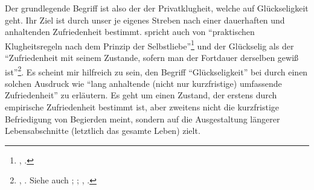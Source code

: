 Der grundlegende Begriff ist also der der Privatklugheit, welche auf
Glückseligkeit geht. Ihr Ziel ist durch unser je eigenes Streben nach einer
dauerhaften und anhaltenden Zufriedenheit bestimmt. 
spricht auch von \enquote{praktischen Klugheitsregeln nach dem Prinzip der
Selbstliebe}\footnote{\cite[][\S~91]{Kant:KritikderUrteilskraft2009}, \cite[][V:
470.9--10]{Kant:GesammelteWerke1900ff.}.} und der Glückselig als der
\enquote{Zufriedenheit mit seinem Zustande, sofern man der Fortdauer derselben
gewiß ist}\footnote{\cite[][A 16]{Kant:DieMetaphysikderSitten1977Tugendlehre},
\cite[][VI: 387.26--27]{Kant:GesammelteWerke1900ff.}. Siehe auch
\cite[][BA 1\,f.,]{Kant:GrundlegungzurMetaphysikderSitten1965}
\cite[][IV: 393.14--16]{Kant:GesammelteWerke1900ff.};
\cite[][A 168\,f.,]{Kant:DieMetaphysikderSitten1977Tugendlehre}
\cite[][VI: 480.23--25]{Kant:GesammelteWerke1900ff.};
\cite[][A 80]{Kant:DieReligioninnerhalbderGrenzenderblossenVernunft1977},
\cite[][VI: 67.20--23]{Kant:GesammelteWerke1900ff.}.}.
Es scheint mir hilfreich zu sein, den Begriff \enquote{Glückseligkeit} bei  durch einen solchen Ausdruck wie \enquote{lang anhaltende (nicht nur kurzfristige) umfassende Zufriedenheit} zu erläutern. Es geht um einen Zustand, der erstens durch empirische Zufriedenheit bestimmt ist, aber zweitens nicht die
kurzfristige Befriedigung von Begierden meint, sondern auf die Ausgestaltung
längerer Lebensabschnitte (letztlich das gesamte Leben) zielt.


